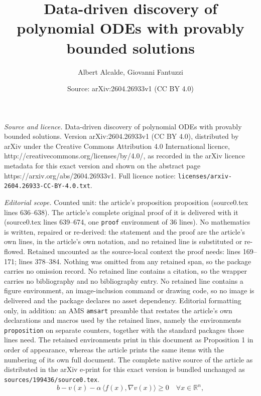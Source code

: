 \documentclass[10pt,a4paper]{amsart}
\title{Data-driven discovery of polynomial ODEs with provably bounded solutions}
\author{Albert Alcalde, Giovanni Fantuzzi}
\date{Source: arXiv:2604.26933v1 (CC BY 4.0)}
\newcommand{\R}{\mathbb{R}}
\newcommand{\ip}[2]{\langle #1, #2 \rangle}
\renewcommand{\vec}[1]{{#1}}
\begin{document}
\maketitle

\noindent\emph{Source and licence.} Data-driven discovery of polynomial ODEs with provably bounded solutions. Version arXiv:2604.26933v1 (CC BY 4.0), distributed by arXiv under the Creative Commons Attribution 4.0 International licence, http://creativecommons.org/licenses/by/4.0/, as recorded in the arXiv licence metadata for this exact version and shown on the abstract page https://arxiv.org/abs/2604.26933v1. Full licence notice: \texttt{licenses/arxiv-2604.26933-CC-BY-4.0.txt}.\par\smallskip

\noindent\textit{Editorial scope.} Counted unit: the article's proposition proposition (source0.tex lines 636--638). The article's complete original proof of it is delivered with it (source0.tex lines 639--674, one \texttt{proof} environment of 36 lines). No mathematics is written, repaired or re-derived: the statement and the proof are the article's own lines, in the article's own notation, and no retained line is substituted or re-flowed.  Retained uncounted as the source-local context the proof needs: lines 169--171; lines 378--384.  Nothing was omitted from any retained span, so the package carries no omission record.  No retained line contains a citation, so the wrapper carries no bibliography and no bibliography entry.  No retained line contains a figure environment, an image-inclusion command or drawing code, so no image is delivered and the package declares no asset dependency.  Editorial formatting only, in addition: an AMS \texttt{amsart} preamble that restates the article's own declarations and macros used by the retained lines, namely the environments \texttt{proposition} on separate counters, together with the standard packages those lines need.  The retained environments print in this document as Proposition 1 in order of appearance, whereas the article prints the same items with the numbering of its own full document.  The complete native source of the article as distributed in the arXiv e-print for this exact version is bundled unchanged as \texttt{sources/199436/source0.tex}.
\begin{equation}\label{e:lyapunov-inequality}
    b - v(\vec{x}) - \alpha\,  \ip{\vec{f}(\vec{x})}{\nabla v(\vec{x})}  \geq 0 \quad \forall \vec{x} \in \R^n,
\end{equation}
\end{document}
